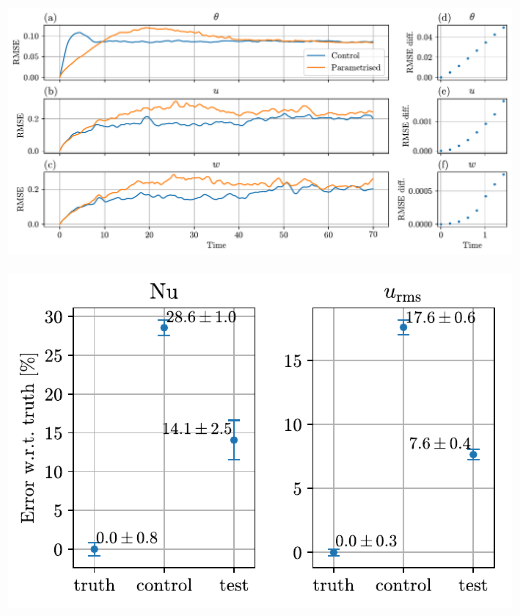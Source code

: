 \documentclass[12pt, aspectratio=169]{beamer}
\begin{document}
\begin{frame}
    \centering
    \includegraphics[width=\linewidth]{figures/rmse.pdf}
\end{frame}

\begin{frame}
    \centering
    \includegraphics[height=0.99\textheight]{figures/stats.pdf}
\end{frame}
\end{document}
